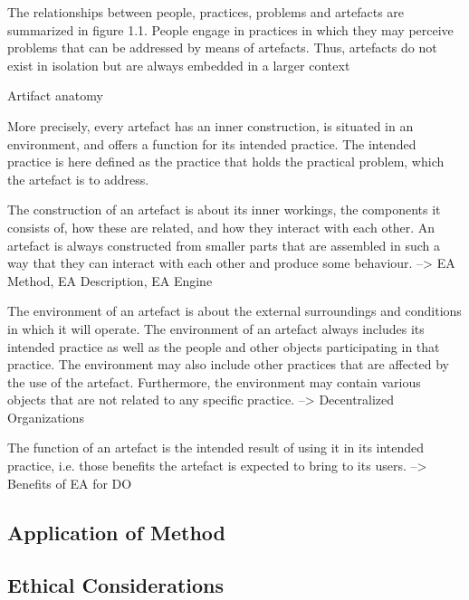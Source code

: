 The relationships between people, practices, problems and artefacts
are summarized in figure 1.1. People engage in practices in
which they may perceive problems that can be addressed by means
of artefacts. Thus, artefacts do not exist in isolation but are always
embedded in a larger context

Artifact anatomy

More precisely, every artefact has an inner construction,
is situated in an environment, and offers a function for its
intended practice. The intended practice is here defined as the practice
that holds the practical problem, which the artefact is to address.

The construction of an artefact is about its inner workings, the
components it consists of, how these are related, and how they interact
with each other. An artefact is always constructed from smaller
parts that are assembled in such a way that they can interact with
each other and produce some behaviour. --> EA Method, EA Description, EA Engine


The environment of an artefact is about the external surroundings
and conditions in which it will operate. The environment of an
artefact always includes its intended practice as well as the people
and other objects participating in that practice. The environment
may also include other practices that are affected by the use of the
artefact. Furthermore, the environment may contain various objects
that are not related to any specific practice. --> Decentralized Organizations


The function of an artefact is the intended result of using it in its
intended practice, i.e. those benefits the artefact is expected to bring
to its users. --> Benefits of EA for DO




\subsection{Application of Method}

\subsection{Ethical Considerations}
